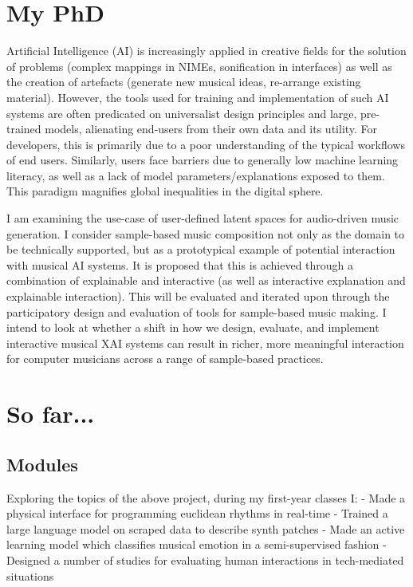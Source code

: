 \documentclass[../main.tex]{subfiles}
\begin{document}

\section{My PhD}
Artificial Intelligence (AI) is increasingly applied in creative fields for the solution of problems (complex mappings in NIMEs, sonification in interfaces) as well as the creation of artefacts (generate new musical ideas, re-arrange existing material). However, the tools used for training and implementation of such AI systems are often predicated on universalist design principles and large, pre-trained models, alienating end-users from their own data and its utility. For developers, this is primarily due to a poor understanding of the typical workflows of end users. Similarly, users face barriers due to generally low machine learning literacy, as well as a lack of model parameters/explanations exposed to them. This paradigm magnifies global inequalities in the digital sphere. 

I am examining the use-case of user-defined latent spaces for audio-driven music generation. I consider sample-based music composition not only as the domain to be technically supported, but as a prototypical example of potential interaction with musical AI systems.
It is proposed that this is achieved through a combination of explainable and interactive (as well as interactive explanation and explainable interaction). This will be evaluated and iterated upon through the participatory design and evaluation of tools for sample-based music making. I intend to look at whether a shift in how we design, evaluate, and implement interactive musical XAI systems can result in richer, more meaningful interaction for computer musicians across a range of sample-based practices. 

\section{So far...}
\subsection{Modules}
Exploring the topics of the above project, during my first-year classes I:
- Made a physical interface for programming euclidean rhythms in real-time
- Trained a large language model on scraped data to describe synth patches
- Made an active learning model which classifies musical emotion in a semi-supervised fashion
- Designed a number of studies for evaluating human interactions in tech-mediated situations
\end{document}
